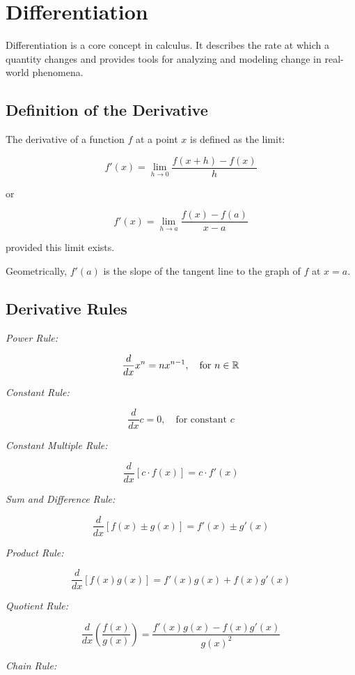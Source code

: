 \newpage
\section{Differentiation}

Differentiation is a core concept in calculus. It describes the rate at which a quantity changes 
and provides tools for analyzing and modeling change in real-world phenomena.

\subsection{Definition of the Derivative}

The derivative of a function \(f\) at a point \(x\) is defined as the limit:

\[
    f'(x) = \lim_{h \to 0} \frac{f(x + h) - f(x)}{h}
\]

or

\[
    f'(x) = \lim_{h \to a}\frac{f(x) - f(a)}{x - a}
\]

provided this limit exists.
\vspace{\baselineskip}

Geometrically, \(f'(a)\) is the slope of the tangent line to the graph of \(f\) at \(x = a\).

\subsection{Derivative Rules}

\emph{Power Rule:}

\[
    \frac{d}{dx} x^n = nx^{n - 1}, \quad \text{for } n \in \mathbb{R}
\]

\emph{Constant Rule:}

\[
    \frac{d}{dx} c = 0, \quad \text{for constant } c
\]

\emph{Constant Multiple Rule:}

\[
    \frac{d}{dx} [c \cdot f(x)] = c \cdot f'(x)
\]

\emph{Sum and Difference Rule:}

\[
    \frac{d}{dx} [f(x) \pm g(x)] = f'(x) \pm g'(x)
\]

\emph{Product Rule:}

\[
    \frac{d}{dx} [f(x)g(x)] = f'(x)g(x) + f(x)g'(x)
\]

\emph{Quotient Rule:}

\[
    \frac{d}{dx} \left( \frac{f(x)}{g(x)} \right) = \frac{f'(x)g(x) - f(x)g'(x)}{{g(x)}^2}
\]

\emph{Chain Rule:}

